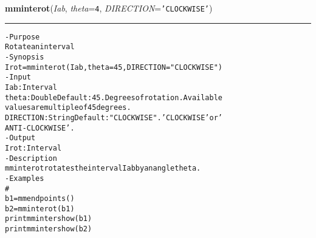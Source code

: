     \label{multireg:num_pymorph:mminterot}
    \vspace{0.5ex}

    \begin{boxedminipage}{\textwidth}

    \raggedright \textbf{mminterot}(\textit{Iab}, \textit{theta}=\texttt{4\-}, \textit{DIRECTION}=\texttt{'\-C\-L\-O\-C\-K\-W\-I\-S\-E\-'\-})

    \vspace{-1.5ex}

    \rule{\textwidth}{0.5\fboxrule}
\begin{alltt}
- Purpose
    Rotate an interval
- Synopsis
    Irot = mminterot(Iab, theta=45, DIRECTION="CLOCKWISE")
- Input
    Iab:       Interval
    theta:     Double Default: 45. Degrees of rotation. Available
               values are multiple of 45 degrees.
    DIRECTION: String Default: "CLOCKWISE". 'CLOCKWISE' or '
               ANTI-CLOCKWISE'.
- Output
    Irot: Interval
- Description
    mminterot rotates the interval Iab by an angle theta .
- Examples
    \#
    b1 = mmendpoints()
    b2 = mminterot(b1)
    print mmintershow(b1)
    print mmintershow(b2)\end{alltt}

    \vspace{1ex}

    \end{boxedminipage}

    \label{multireg:num_pymorph:mmintersec}
    \vspace{0.5ex}

